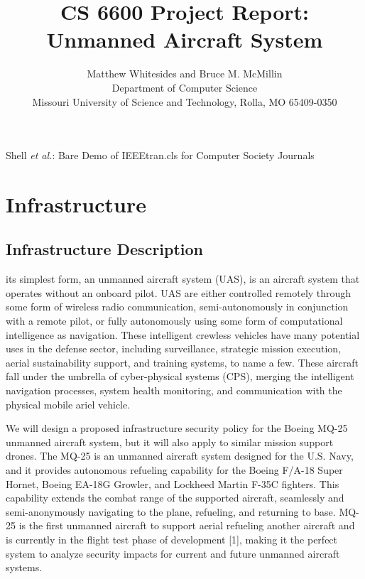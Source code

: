 \documentclass[10pt,journal,compsoc]{IEEEtran}
\begin{document}
\title{CS 6600 Project Report: Unmanned Aircraft System}

\author{Matthew Whitesides and Bruce M. McMillin \\
Department of Computer Science \\
Missouri University of Science and Technology, Rolla, MO 65409-0350} 

%
{Shell \MakeLowercase{\textit{et al.}}: Bare Demo of IEEEtran.cls for Computer Society Journals}
 

\maketitle

\IEEEpeerreviewmaketitle


\section{Infrastructure}

\subsection{Infrastructure Description}

 its simplest form, an unmanned aircraft system (UAS), is an aircraft system that operates without an onboard pilot. 
UAS are either controlled remotely through some form of wireless radio communication, semi-autonomously in conjunction with a remote pilot, or fully autonomously using some form of computational intelligence as navigation. 
These intelligent crewless vehicles have many potential uses in the defense sector, including surveillance, strategic mission execution, aerial sustainability support, and training systems, to name a few. 
These aircraft fall under the umbrella of cyber-physical systems (CPS), merging the intelligent navigation processes, system health monitoring, and communication with the physical mobile ariel vehicle.

We will design a proposed infrastructure security policy for the Boeing MQ-25 unmanned aircraft system, but it will also apply to similar mission support drones. 
The MQ-25 is an unmanned aircraft system designed for the U.S. Navy, and it provides autonomous refueling capability for the Boeing F/A-18 Super Hornet, Boeing EA-18G Growler, and Lockheed Martin F-35C fighters.
This capability extends the combat range of the supported aircraft, seamlessly and semi-anonymously navigating to the plane, refueling, and returning to base. 
MQ-25 is the first unmanned aircraft to support aerial refueling another aircraft and is currently in the flight test phase of development [1], making it the perfect system to analyze security impacts for current and future unmanned aircraft systems. 
\end{document}
